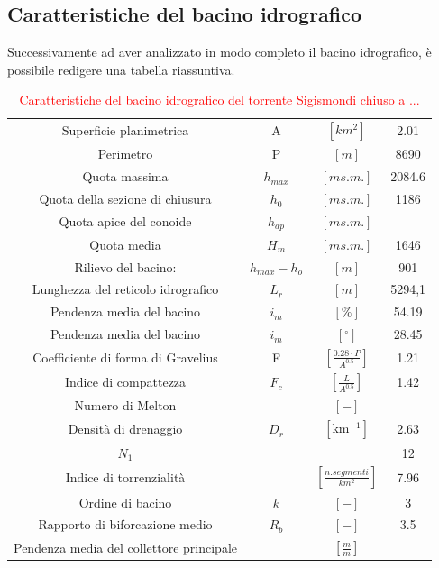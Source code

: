 \subsection{Caratteristiche del bacino idrografico}
Successivamente ad aver analizzato in modo completo il bacino idrografico, è possibile redigere una tabella riassuntiva.
\begin{table}[H] \centering
    \caption{\textcolor{red}{Caratteristiche del bacino idrografico  del torrente Sigismondi chiuso a ...}}
    \label{tab:caratteristiche_bacino}
    \begin{tabular}{ cccc } 
    \toprule
    Superficie planimetrica & A &  $\left[km^2\right]$ & 2.01 \\ 
    Perimetro & P & $\left[m\right]$        &      8690       \\ 
    Quota massima & $h_{max}$&  $\left[m s.m.\right]$       &    2084.6     \\
    Quota della sezione di chiusura & $h_0$ & $\left[m s.m.\right]$        &       1186      \\ 
    Quota apice del conoide &$h_{ap}$& $\left[m s.m.\right]$ & \\ 
    Quota media& $H_m$ & $\left[m s.m.\right]$ & 1646    \\ 
    Rilievo del bacino:& $h_{max} - h_o$ & $\left[m\right]$ &   901 \\ 
    Lunghezza del reticolo idrografico& $L_r$& $\left[m\right]$ & 5294,1 \\ 
    Pendenza media del bacino& $i_m$ & $\left[\%\right]$ & 54.19    \\ 
    Pendenza media del bacino& $i_m$& $\left[ ^\circ \right]$ & 28.45   \\ 
    Coefficiente di forma di Gravelius& F& $\left[\frac{0.28 \cdot P}{A^{0.5}} \right]$ & 1.21\\  
    Indice di compattezza &$F_c$  & $ \left[\frac{L}{A^{0.5}}\right]$ & 1.42\\ 
    Numero di Melton& & $\left[-\right]$ & \\ 
    Densità di drenaggio &$D_r$& $\left[\si{\km^{-1}}\right]$& 2.63 \\ 
    $N_1$& & & 12 \\ 
    Indice di torrenzialità& &$\left[\frac{n. segmenti }{km^2}\right]$ & 7.96 \\  
    Ordine di bacino& $k$ & $\left[-\right]$ & 3 \\ 
    Rapporto di biforcazione medio& $R_b$ & $\left[-\right]$ &  3.5 \\  
    Pendenza media del collettore principale & & $\left[\frac{m}{m}\right]$ & \\  
    \bottomrule
\end{tabular}
\end{table}